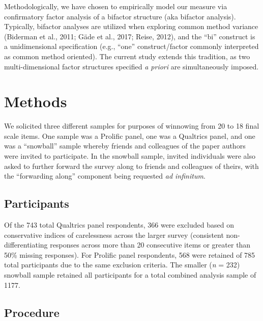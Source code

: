 \documentclass[
  man]{apa6}
\begin{document}
Methodologically, we have chosen to empirically model our measure via confirmatory factor analysis of a bifactor structure (aka bifactor analysis). Typically, bifactor analyses are utilized when exploring common method variance (Biderman et al., 2011; Gäde et al., 2017; Reise, 2012), and the ``bi'' construct is a unidimensional specification (e.g., ``one'' construct/factor commonly interpreted as common method oriented). The current study extends this tradition, as two multi-dimensional factor structures specified \emph{a priori} are simultaneously imposed.

\hypertarget{methods}{%
\section{Methods}\label{methods}}

We solicited three different samples for purposes of winnowing from 20 to 18 final scale items. One sample was a Prolific panel, one was a Qualtrics panel, and one was a ``snowball'' sample whereby friends and colleagues of the paper authors were invited to participate. In the snowball sample, invited individuals were also asked to further forward the survey along to friends and colleagues of theirs, with the ``forwarding along'' component being requested \emph{ad infinitum}.

\hypertarget{participants}{%
\subsection{Participants}\label{participants}}

Of the 743 total Qualtrics panel respondents, 366 were excluded based on conservative indices of carelessness across the larger survey (consistent non-differentiating responses across more than 20 consecutive items or greater than 50\% missing responses). For Prolific panel respondents, 568 were retained of 785 total participants due to the same exclusion criteria. The smaller (\emph{n} = 232) snowball sample retained all participants for a total combined analysis sample of 1177.

\hypertarget{procedure}{%
\subsection{Procedure}\label{procedure}}
\end{document}
